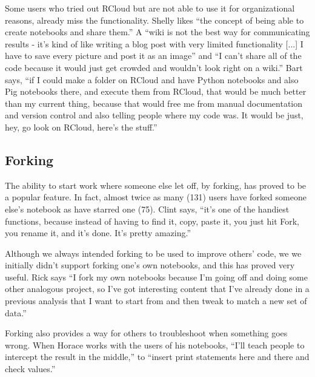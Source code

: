 Some users who tried out RCloud but are not able to use it for organizational
reasons, already miss the functionality. Shelly likes ``the concept of being
able to create notebooks and share them.'' A ``wiki is not the best way for
communicating results - it's kind of like writing a blog post with very limited
functionality [...] I have to save every picture and post it as an image'' and
``I can't share all of the code because it would just get crowded and wouldn't
look right on a wiki.'' Bart says, ``if I could make a folder on RCloud and have
Python notebooks and also Pig notebooks there, and execute them from RCloud,
that would be much better than my current thing, because that would free me from
manual documentation and version control and also telling people where my code
was. It would be just, hey, go look on RCloud, here's the stuff.''



\subsection{Forking}
The ability to start work where someone else let off, by forking, has proved to
be a popular feature. In fact, almost twice as many (131) users have forked
someone else's notebook as have starred one (75).  Clint says, ``it's one of the
handiest functions, because instead of having to find it, copy, paste it, you
just hit Fork, you rename it, and it's done. It's pretty amazing.''

Although we always intended forking to be used to improve others' code, we we
initially didn't support forking one's own notebooks, and this has proved very
useful. Rick says ``I fork my own notebooks because I'm going off and doing some
other analogous project, so I've got interesting content that I've already done
in a previous analysis that I want to start from and then tweak to match a new
set of data.''

Forking also provides a way for others to troubleshoot when something goes
wrong.  When Horace works with the users of his notebooks, ``I'll teach people
to intercept the result in the middle,'' to ``insert print statements here and
there and check values.''



